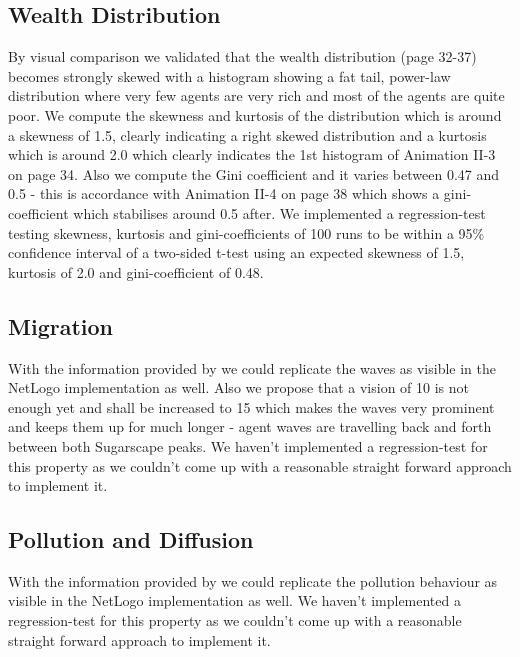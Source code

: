 \subsection{Wealth Distribution}
By visual comparison we validated that the wealth distribution (page 32-37) becomes strongly skewed with a histogram showing a fat tail, power-law distribution where very few agents are very rich and most of the agents are quite poor. We compute the skewness and kurtosis of the distribution which is around a skewness of 1.5, clearly indicating a right skewed distribution and a kurtosis which is around 2.0 which clearly indicates the 1st histogram of Animation II-3 on page 34. Also we compute the Gini coefficient and it varies between 0.47 and 0.5 - this is accordance with Animation II-4 on page 38 which shows a gini-coefficient which stabilises around 0.5 after. 
We implemented a regression-test testing skewness, kurtosis and gini-coefficients of 100 runs to be within a 95\% confidence interval of a two-sided t-test using an expected skewness of 1.5, kurtosis of 2.0 and gini-coefficient of 0.48.

\subsection{Migration}
With the information provided by \cite{weaver_replicating_2009} we could replicate the waves as visible in the NetLogo implementation as well. Also we propose that a vision of 10 is not enough yet and shall be increased to 15 which makes the waves very prominent and keeps them up for much longer - agent waves are travelling back and forth between both Sugarscape peaks. We haven't implemented a regression-test for this property as we couldn't come up with a reasonable straight forward approach to implement it.

\subsection{Pollution and Diffusion}
With the information provided by \cite{weaver_replicating_2009} we could replicate the pollution behaviour as visible in the NetLogo implementation as well. We haven't implemented a regression-test for this property as we couldn't come up with a reasonable straight forward approach to implement it.


